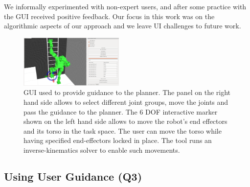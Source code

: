 \documentclass{article}
\begin{document}
We informally experimented with non-expert users, and after some practice with the GUI received positive feedback. Our focus in this work was on the algorithmic aspects of our approach and we leave UI challenges to future work.

\begin{figure}[tb]
  \centering
  	\includegraphics[width=0.46\textwidth]{fig/panel.png}
  \caption{
		GUI used to provide guidance to the planner. The panel on the right hand side allows to select different joint groups, move the joints and pass the guidance to the planner. The 6 DOF interactive marker shown on the left hand side allows to move the robot's end effectors and its torso in the task space. The user can move the torso while having specified end-effectors locked in place. The tool runs an inverse-kinematics solver to enable such movements.
}
   	\label{fig:gui}
  	\vspace{-2mm}
\end{figure}

\subsection{Using User Guidance (Q3)}
\label{sec:q3}
\end{document}
